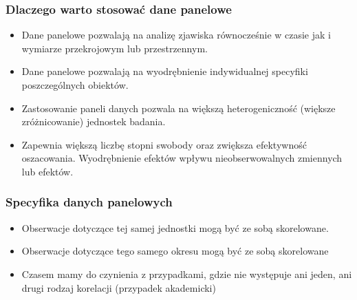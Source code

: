 \subsubsection{Dlaczego warto stosować dane panelowe}
\begin{itemize}
\item Dane panelowe pozwalają na analizę zjawiska równocześnie w czasie jak i wymiarze przekrojowym lub przestrzennym.
\item Dane panelowe pozwalają na wyodrębnienie indywidualnej specyfiki poszczególnych obiektów.
\item Zastosowanie paneli danych pozwala na większą heterogeniczność (większe zróżnicowanie) jednostek badania.
\item Zapewnia większą liczbę stopni swobody oraz zwiększa efektywność oszacowania.
Wyodrębnienie efektów wpływu nieobserwowalnych zmiennych lub efektów.
\end{itemize}
\subsubsection{Specyfika danych panelowych}
\begin{itemize}
\item Obserwacje dotyczące tej samej jednostki mogą być ze sobą skorelowane.
\item Obserwacje dotyczące tego samego okresu mogą być ze sobą skorelowane
\item Czasem mamy do czynienia z przypadkami, gdzie nie występuje ani jeden, ani drugi rodzaj korelacji (przypadek akademicki)
\end{itemize}
